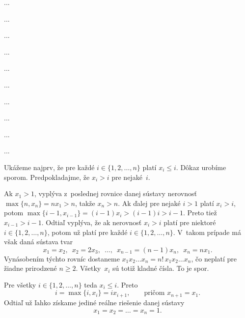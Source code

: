 {%
...}

{%
...}

{%
...}

{%
...}

{%
...}

{%
...}

{%
...}

{%
...}

{%
...}

{%
...}

{%
Ukážeme najprv, že pre každé $i\in\{1,2,\dots,n\}$ platí
 $x_i\leq i$. Dôkaz urobíme sporom. Predpokladajme, že $x_i>i$
pre nejaké~$i$.

Ak $x_1>1$, vyplýva z~poslednej rovnice danej sústavy nerovnosť
$\max \{n,x_n\}=nx_1>n$, takže $x_n>n$. Ak ďalej pre nejaké
$i>1$ platí $x_i>i$, potom $\max \{i-1,x_{i-1}\}=(i-1)x_i>(i-1)i>i-1$.
Preto tiež $x_{i-1}>i-1$. Odtiaľ vyplýva, že ak nerovnosť
$x_i>i$ platí pre niektoré $i\in \{1,2,\dots,n\}$, potom už platí pre
každé $i\in\{1,2,\dots,n\}$. V~takom prípade má však daná sústava
tvar
$$
x_1=x_2,\enspace x_2=2x_3,\enspace \dots,\enspace
x_{n-1}=(n-1)x_n,\enspace x_n=nx_1.
$$
Vynásobením týchto rovníc dostaneme $x_1x_2\dots
x_n=n!\,x_1x_2\dots x_n$, čo neplatí pre žiadne prirodzené $n\geq
2$. Všetky~$x_i$ sú totiž kladné čísla. To je spor.

Pre všetky $i\in\{1,2,\dots,n\}$ teda $x_i\leq i$. Preto
$$
i=\max \{i,x_i\}=ix_{i+1},\qquad \text{pričom }x_{n+1}=x_1.
$$
Odtiaľ už ľahko získame jediné reálne riešenie danej sústavy
$$
x_1=x_2=\dots =x_n=1.
$$}

